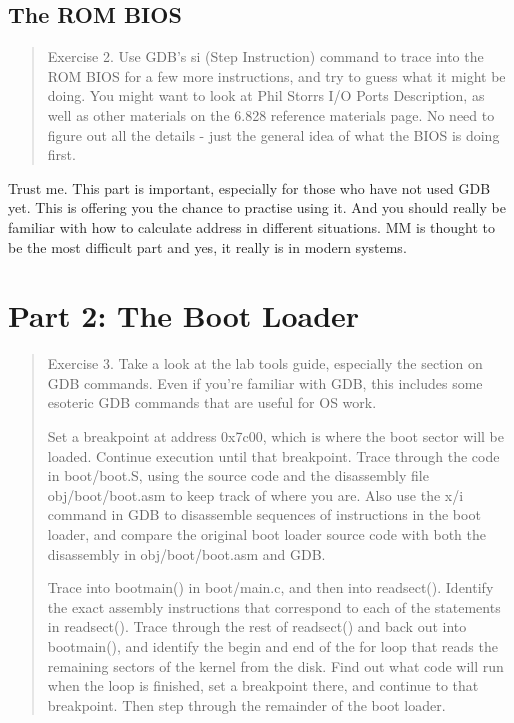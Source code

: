 \documentclass[10pt]{article}
\begin{document}
	\subsection{The ROM BIOS}
		\begin{quote}\begin{colorboxed}
		Exercise 2. Use GDB's si (Step Instruction) command to trace into the ROM BIOS for a few more instructions, and try to guess what it might be doing. You might want to look at Phil Storrs I/O Ports Description, as well as other materials on the 6.828 reference materials page. No need to figure out all the details - just the general idea of what the BIOS is doing first.
		\end{colorboxed}\end{quote}
		\begin{flushleft}
		Trust me. This part is important, especially for those who have not used GDB yet. This is offering you the chance to practise using it. And you should really be familiar with how to calculate address in different situations. MM is thought to be the most difficult part and yes, it really is in modern systems.
		\end{flushleft}

\section{Part 2: The Boot Loader}
	\begin{quote}	
	\begin{colorboxed}
	Exercise 3. Take a look at the lab tools guide, especially the section on GDB commands. Even if you're familiar with GDB, this includes some esoteric GDB commands that are useful for OS work.

	Set a breakpoint at address 0x7c00, which is where the boot sector will be loaded. Continue execution until that breakpoint. Trace through the code in boot/boot.S, using the source code and the disassembly file obj/boot/boot.asm to keep track of where you are. Also use the x/i command in GDB to disassemble sequences of instructions in the boot loader, and compare the original boot loader source code with both the disassembly in obj/boot/boot.asm and GDB.

	Trace into bootmain() in boot/main.c, and then into readsect(). Identify the exact assembly instructions that correspond to each of the statements in readsect(). Trace through the rest of readsect() and back out into bootmain(), and identify the begin and end of the for loop that reads the remaining sectors of the kernel from the disk. Find out what code will run when the loop is finished, set a breakpoint there, and continue to that breakpoint. Then step through the remainder of the boot loader. 
	\end{colorboxed}
	\end{quote}
\end{document}
